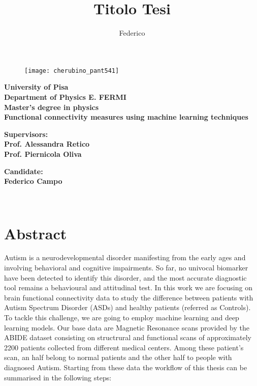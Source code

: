\documentclass[11pt]{report}
\title{Titolo Tesi}
\author{Federico}
\begin{document}
\begin{titlepage}
\begin{figure}[t]
\centering
\texttt{[image: cherubino\_pant541]}
\end{figure}

\begin{center}
	\textbf{University of Pisa \\ Department of Physics E. FERMI\\ Master's degree in physics\\}
	\vspace{20mm}
    {\LARGE{\bf Functional connectivity measures using machine learning techniques}}
\end{center}

\vspace{36mm}
\begin{minipage}[t]{0.47\textwidth}
	{\large{\bf Supervisors:\\ Prof. Alessandra Retico\\ Prof. Piernicola Oliva}}
\end{minipage}\hfill\begin{minipage}[t]{0.47\textwidth}\raggedleft
	{\large{\bf Candidate: \\ Federico Campo}}
\end{minipage}

\vspace{60mm}
\hrulefill
\\

\end{titlepage}


\tableofcontents

\chapter*{Abstract}
Autism is a neurodevelopmental disorder manifesting from the early ages and involving behavioral and cognitive impairments. So far, no univocal biomarker have been detected to identify this disorder, and the most accurate diagnostic tool remains a behavioural and attitudinal test.
In this work we are focusing on brain functional connectivity data to study the difference between patients with Autism Spectrum Disorder (ASDs) and healthy patients (referred as Controls). To tackle this challenge, we are going to employ machine learning and deep learning models.
Our base data are Magnetic Resonance scans provided by the ABIDE dataset consisting on structrural and functional scans of approximately 2200 patients collected from different medical centers.
Among these patient's scan, an half belong to normal patients and the other half to people with diagnosed Autism.
Starting from these data the workflow of this thesis can be summarised in the following steps:
\end{document}
